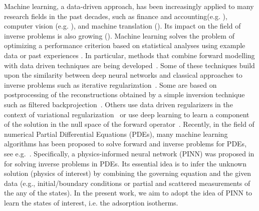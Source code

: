 \documentclass[thmsa,onecolumn,12pt]{article}%
\begin{document}
Machine learning, a data-driven approach, has been increasingly applied to many research fields in the past decades, such as finance and accounting(e.g. \cite{Gu-Kelly-Xiu-2020, Freyberger2020, Zhou2011}),  computer vision (e.g. \cite{He-Zhang2016,Shin2016}), and machine translation (\cite{Vaswani2017, devlin2019bert}). Its impact on the field of inverse problems is also growing (\cite{DeVito2005, Lucas2018, Raissi2018, Morshed1998}). Machine learning solves the problem of optimizing a performance criterion based on statistical
analyses using example data or past experiences \cite{Hastie2009}. In particular, methods that combine forward modelling with data driven techniques are being developed~\cite{Arridge-Maass-Oktem-Schonlieb}. Some of these techniques build upon the similarity between deep neural networks and classical approaches to inverse problems such as iterative regularization~\cite{Adler-Oktem-2017}. Some are based on postprocessing of the reconstructions obtained by a simple inversion technique such as filtered backprojection~\cite{Jin-McCann-2017}. Others use data driven regularizers in the context of variational regularization~\cite{Li-Schwab-2020} or use deep learning to learn a component of the solution in the null space of the forward operator~\cite{Schwab-Antholzer-2019,Bubba-Kutyniok-2019}. Recently, in the field of numerical Partial Differential Equations (PDEs), many machine learning algorithms has been proposed to solve forward and inverse problems for PDEs, see e.g.~\cite{HanJentzenE2018,LiChenTaiE2018,HeXu2019,HeLiXuZheng2020}. Specifically, a physics-informed neural network (PINN) was proposed in \cite{Raissi2019} for solving inverse problems in PDEs. Its essential idea is to infer the unknown solution (physics of interest) by combining the governing equation and the given data (e.g., initial/boundary conditions or partial and scattered measurements of the any of the states). In the present work, we aim to adopt the idea of PINN to learn the states of interest, i.e. the adsorption isotherms.
\end{document}
